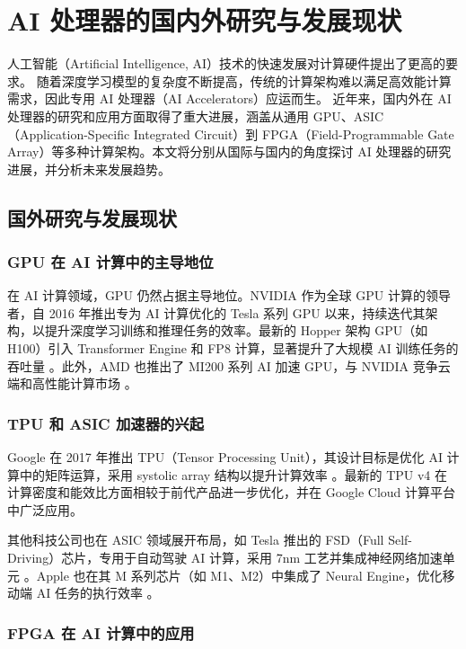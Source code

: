 \section{AI 处理器的国内外研究与发展现状}

人工智能（Artificial Intelligence, AI）技术的快速发展对计算硬件提出了更高的要求。
随着深度学习模型的复杂度不断提高，传统的计算架构难以满足高效能计算需求，因此专用 AI 处理器（AI Accelerators）应运而生。
近年来，国内外在 AI 处理器的研究和应用方面取得了重大进展\cite{yishouyi}，涵盖从通用 GPU、ASIC（Application-Specific Integrated Circuit）到 FPGA（Field-Programmable Gate Array）等多种计算架构。本文将分别从国际与国内的角度探讨 AI 处理器的研究进展，并分析未来发展趋势。

\subsection{国外研究与发展现状}

\subsubsection{GPU 在 AI 计算中的主导地位}

在 AI 计算领域，GPU 仍然占据主导地位。NVIDIA 作为全球 GPU 计算的领导者，自 2016 年推出专为 AI 计算优化的 Tesla 系列 GPU 以来，持续迭代其架构，以提升深度学习训练和推理任务的效率。最新的 Hopper 架构 GPU（如 H100）引入 Transformer Engine 和 FP8 计算，显著提升了大规模 AI 训练任务的吞吐量 \cite{nvidia2022hopper}。此外，AMD 也推出了 MI200 系列 AI 加速 GPU，与 NVIDIA 竞争云端和高性能计算市场 \cite{amd2021mi200}。

\subsubsection{TPU 和 ASIC 加速器的兴起}

Google 在 2017 年推出 TPU（Tensor Processing Unit），其设计目标是优化 AI 计算中的矩阵运算，采用 systolic array 结构以提升计算效率 \cite{jouppi2017datacenter}。最新的 TPU v4 在计算密度和能效比方面相较于前代产品进一步优化，并在 Google Cloud 计算平台中广泛应用。

其他科技公司也在 ASIC 领域展开布局，如 Tesla 推出的 FSD（Full Self-Driving）芯片，专用于自动驾驶 AI 计算，采用 7nm 工艺并集成神经网络加速单元 \cite{tesla2020fsd}。Apple 也在其 M 系列芯片（如 M1、M2）中集成了 Neural Engine，优化移动端 AI 任务的执行效率 \cite{apple2021neural}。

\subsubsection{FPGA 在 AI 计算中的应用}


